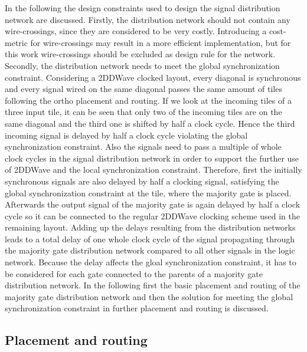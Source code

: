 In the following the design constraints used to design the signal distribution network are discussed. Firstly, the distribution network should not contain any wire-crossings, since they are considered to be very costly. Introducing a cost-metric for wire-crossings may result in a more efficient implementation, but for this work wire-crossings should be excluded as design rule for the network. Secondly, the distribution network needs to meet the global synchronization constraint. Considering a 2DDWave clocked layout, every diagonal is synchronous and every signal wired on the same diagonal passes the same amount of tiles following the ortho placement and routing. If we look at the incoming tiles of a three input tile, it can be seen that only two of the incoming tiles are on the same diagonal and the third one is shifted by half a clock cycle. Hence the third incoming signal is delayed by half a clock cycle violating the global synchronization constraint. Also the signals need to pass a multiple of whole clock cycles in the signal distribution network in order to support the further use of 2DDWave and the local synchronization constraint. Therefore, first the initially synchronous signals are also delayed by half a clocking signal, satisfying the global synchronization constraint at the tile, where the majority gate is placed. Afterwards the output signal of the majority gate is again delayed by half a clock cycle so it can be connected to the regular 2DDWave clocking scheme used in the remaining layout. Adding up the delays resulting from the distribution networks leads to a total delay of one whole clock cycle of the signal propagating through the majority gate distribution network compared to all other signals in the logic network. Because the delay affects the gloal synchronization constraint, it has to be considered for each gate connected to the parents of a majority gate distribution network. In the following first the basic placement and routing of the majority gate distribution network and then the solution for meeting the global synchronization constraint in further placement and routing is discussed. 

\subsection{Placement and routing}

